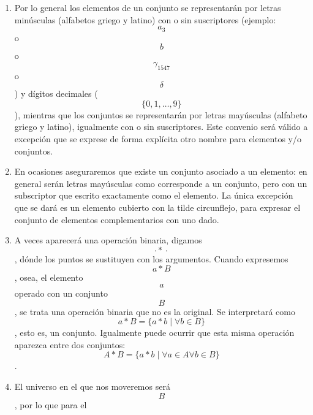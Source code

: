 \begin{enumerate}
\begin{enumerate}
    \begin{enumerate}
    \def\labelenumiii{\arabic{enumiii}.}
    \tightlist
    \item
      \begin{enumerate}
      \def\labelenumiv{\arabic{enumiv}.}
      \tightlist
      \item
        \[\lbrack 0,1\rbrack_{\mathbb{Q}}{: = {\lbrack 0,1\rbrack \cap \mathbb{Q}}}\].
      \item
        \[{\lbrack 0,1\rbrack_{\mathbb{Q}}}^{1}{: = \lbrack 0,1\rbrack_{\mathbb{Q}}}\].
      \item
        \[{\lbrack 0,1\rbrack_{\mathbb{Q}}}^{n}{: = {{\lbrack 0,1\rbrack_{\mathbb{Q}}}^{n - 1} \times {\lbrack 0,1\rbrack_{\mathbb{Q}}}^{1}}}\]
      \end{enumerate}
    \end{enumerate}
  \item
    Por lo general los elementos de un conjunto se representarán por
    letras minúsculas (alfa\-betos griego y latino) con o sin
    suscriptores (ejemplo:\[a_{3}\]o\[b\]o\[\gamma_{1547}\]o\[\delta\])
    y dí\-gitos decimales (\[\{{0,1,\ldots,9}\}\]), mientras que los
    conjuntos se representarán por letras mayúsculas (alfabeto griego y
    latino), igualmente con o sin suscriptores. Este convenio será
    válido a excepción que se exprese de forma explícita otro nombre
    para elementos y/o conjuntos.
  \item
    En ocasiones aseguraremos que existe un conjunto asociado a un
    elemento: en general serán letras mayúsculas como corresponde a un
    conjunto, pero con un subscriptor que escrito exactamente como el
    elemento. La única excepción que se dará es un elemento cubierto con
    la tilde circunflejo, para expresar el conjunto de elementos
    complementa\-rios con uno dado.
  \item
    A veces aparecerá una operación binaria,
    digamos\[{\cdot \ast} \cdot\], dónde los puntos se sustitu\-yen con
    los argumentos. Cuando expresemos \[a \ast B\], osea, el elemento
    \[a\]operado con un conjunto \[B\], se trata una operación binaria
    que no es la original. Se interpreta\-rá como
    \[{a \ast B} = {\{{{a \ast b} \mid \forall{b \in B}}\}}\] , esto es,
    un conjunto. Igualmente puede ocurrir que esta misma operación
    aparezca entre dos conjuntos:
    \[{A \ast B} = {\{{{a \ast b} \mid {\forall{a \in A}\forall{b \in B}}}\}}\].
  \item
    El universo en el que nos moveremos será\[B\], por lo que para el

\end{enumerate}
\end{enumerate}
